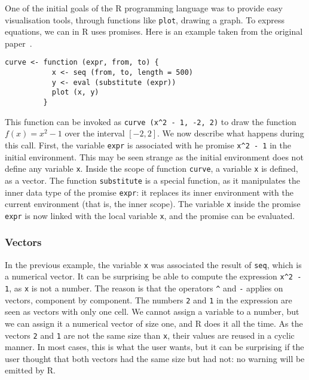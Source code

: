 \documentclass{article}
\newcommand\R{R}
\begin{document}
One of the initial goals of the \R{} programming language
was to provide easy visualisation tools,
through functions like \texttt{plot},
drawing a graph.
To express equations, we can in \R{} uses promises.
Here is an example taken from the original paper~\parencite{ihaka1996r}.
\begin{verbatim}
curve <- function (expr, from, to) {
           x <- seq (from, to, length = 500)
           y <- eval (substitute (expr))
           plot (x, y)
         }
\end{verbatim}
This function can be invoked as
\texttt{curve (x^2 - 1, -2, 2)}
to draw the function \(f(x) = x^2 - 1\)
over the interval \([-2, 2]\).
We now describe what happens during
this call.
First, the variable \texttt{expr}
is associated with he promise \texttt{x^2 - 1}
in the initial environment.
This may be seen strange as the initial environment
does not define any variable \texttt{x}.
Inside the scope of function \texttt{curve},
a variable \texttt{x} is defined, as a vector.
The function \texttt{substitute} is a special function,
as it manipulates the inner data type of the promise \texttt{expr}:
it replaces its inner environment with the current environment
(that is, the inner scope).
The variable \texttt{x} inside the promise
\texttt{expr} is now linked with the local
variable \texttt{x},
and the promise can be evaluated.


\subsubsection{Vectors}

In the previous example,
the variable \texttt{x} was associated the result
of \texttt{seq}, which is a numerical vector.
It can be surprising be able to compute
the expression \texttt{x^2 - 1},
as \texttt{x} is not a number.
The reason is that the operators \texttt{^} and \texttt{-}
applies on vectors, component by component.
The numbers \texttt{2} and \texttt{1}
in the expression are seen as vectors with only one cell.
We cannot assign a variable to a number,
but we can assign it a numerical vector of size one,
and \R{} does it all the time.
As the vectors \texttt{2} and \texttt{1}
are not the same size than \texttt{x},
their values are reused in a cyclic manner.
In most cases, this is what the user wants,
but it can be surprising if the user thought that both
vectors had the same size but had not:
no warning will be emitted by \R{}.
\end{document}
